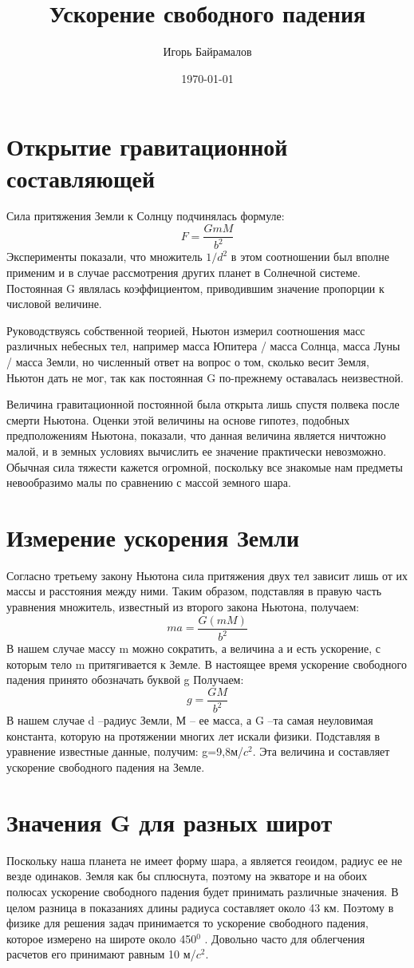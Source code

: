 \documentclass{article}
\title{Ускорение свободного падения}
\author{Игорь Байрамалов}
\date{\today}
\begin{document}
\section{Открытие гравитационной составляющей}
Сила притяжения Земли к Солнцу подчинялась формуле:
\begin{equation}
F=\frac {GmM}{b^2}
\end{equation}
Эксперименты показали, что множитель \(1/d^2\) в этом соотношении был вполне применим и в случае рассмотрения других планет в Солнечной системе. Постоянная G являлась коэффициентом, приводившим значение пропорции к числовой величине.

Руководствуясь собственной теорией, Ньютон измерил соотношения масс различных небесных тел, например масса Юпитера / масса Солнца, масса Луны / масса Земли, но численный ответ на вопрос о том, сколько весит Земля, Ньютон дать не мог, так как постоянная G по-прежнему оставалась неизвестной.

Величина гравитационной постоянной была открыта лишь спустя полвека после смерти Ньютона. Оценки этой величины на основе гипотез, подобных предположениям Ньютона, показали, что данная величина является ничтожно малой, и в земных условиях вычислить ее значение практически невозможно. Обычная сила тяжести кажется огромной, поскольку все знакомые нам предметы невообразимо малы по сравнению с массой земного шара.

\section{Измерение ускорения Земли}
Согласно третьему закону Ньютона сила притяжения двух тел зависит лишь от их массы и расстояния между ними. Таким образом, подставляя в правую часть уравнения множитель, известный из второго закона Ньютона, получаем:
\begin{equation}
ma=\frac {G(mM)}{b^2}
\end{equation}
В нашем случае массу m можно сократить, а величина а и есть ускорение, с которым тело m притягивается к Земле. В настоящее время ускорение свободного падения принято обозначать буквой g Получаем:
\begin{equation}
g=\frac {GM}{b^2}
\end{equation}
В нашем случае d –радиус Земли, М – ее масса, а G –та самая неуловимая константа, которую на протяжении многих лет искали физики. Подставляя в уравнение известные данные, получим: g=9,8м/\(c^2\). Эта величина и составляет ускорение свободного падения на Земле.
\section{Значения G для разных широт}
Поскольку наша планета не имеет форму шара, а является геоидом, радиус ее не везде одинаков. Земля как бы сплюснута, поэтому на экваторе и на обоих полюсах ускорение свободного падения будет принимать различные значения. В целом разница в показаниях длины радиуса составляет около 43 км. Поэтому в физике для решения задач принимается то ускорение свободного падения, которое измерено на широте около 450\(^0\) . Довольно часто для облегчения расчетов его принимают равным 10 м/\(c^2\).
\end{document}
